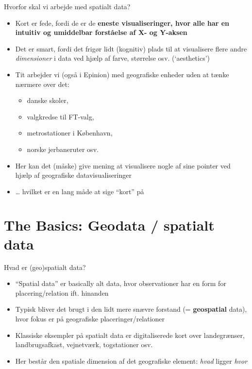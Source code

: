 \documentclass[
  8pt,
  ignorenonframetext,
  aspectratio=169]{beamer}
\providecommand{\tightlist}{%
  \setlength{\itemsep}{0pt}\setlength{\parskip}{0pt}}
\begin{document}
\begin{frame}{Hvorfor skal vi arbejde med spatialt data?}
\protect\hypertarget{hvorfor-skal-vi-arbejde-med-spatialt-data-2}{}
\begin{itemize}
\item
  Kort er fede, fordi de er de \textbf{eneste visualiseringer, hvor alle
  har en intuitiv og umiddelbar forståelse af X- og Y-aksen}
\item
  Det er smart, fordi det frigør lidt (kognitiv) plads til at
  visualisere flere andre \emph{dimensioner} i data ved hjælp af farve,
  størrelse osv. (`aesthetics')
\item
  Tit arbejder vi (også i Epinion) med geografiske enheder uden at tænke
  nærmere over det:

  \begin{itemize}
  \tightlist
  \item
    danske skoler,
  \item
    valgkredse til FT-valg,
  \item
    metrostationer i København,
  \item
    norske jerbaneruter osv.
  \end{itemize}
\item
  Her kan det (måske) give mening at visualisere nogle af sine pointer
  ved hjælp af geografiske datavisualiseringer
\item
  \ldots{} hvilket er en lang måde at sige ``kort'' på
\end{itemize}
\end{frame}

\hypertarget{the-basics-geodata-spatialt-data}{%
\section{The Basics: Geodata / spatialt
data}\label{the-basics-geodata-spatialt-data}}

\begin{frame}{Hvad er (geo)spatialt data?}
\protect\hypertarget{hvad-er-geospatialt-data}{}
\begin{itemize}
\item
  ``Spatial data'' er basically alt data, hvor observationer har en form
  for placering/relation ift. hinanden
\item
  Typisk bliver det brugt i den lidt mere snævre forstand (=
  \textbf{geospatial} data), hvor fokus er på geografiske
  placeringer/relationer
\item
  Klassiske eksempler på spatialt data er digitaliserede kort over
  landegrænser, landbrugsafkast, vejnetværk, togstationer osv.
\item
  Her består den spatiale dimension af det geografiske element:
  \emph{hvad} ligger \emph{hvor}
\end{itemize}
\end{frame}
\end{document}
